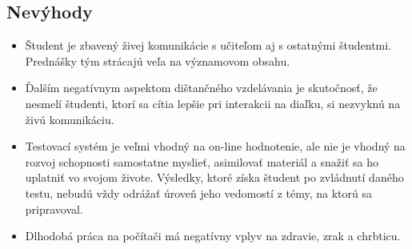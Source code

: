 \documentclass[10pt,oneside,slovak,a4paper]{article}
\begin{document}
\begin{itemize}
\end{itemize}
\subsection{Nevýhody}
\begin{itemize}
	\item Študent je zbavený živej komunikácie s učiteľom aj s ostatnými študentmi. Prednášky tým strácajú veľa na významovom obsahu.
	\item Ďalším negatívnym aspektom dištančného vzdelávania je skutočnosť, že nesmelí študenti, ktorí sa cítia lepšie pri interakcii na diaľku, si nezvyknú na živú komunikáciu.
	\item Testovací systém je veľmi vhodný na on-line hodnotenie, ale nie je vhodný na rozvoj schopnosti samostatne myslieť, asimilovať materiál a snažiť sa ho uplatniť vo svojom živote. Výsledky, ktoré získa študent po zvládnutí daného testu, nebudú vždy odrážať úroveň jeho vedomostí z témy, na ktorú sa pripravoval.
	\item Dlhodobá práca na počítači má negatívny vplyv na zdravie, zrak a chrbticu.
\end{itemize}
\end{document}
